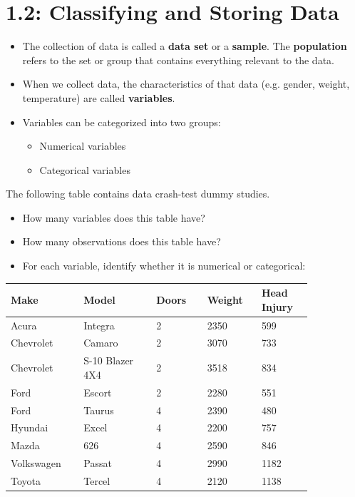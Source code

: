 \documentclass[../mathNotesPreamble]{subfiles}
\providecommand{\relscalefact}{1.4}
\begin{document}
\relscale{\relscalefact}
  \section{1.2: Classifying and Storing Data}
  \begin{itemize}
    \item The collection of data is called a \textbf{data set} or a \textbf{sample}. The \textbf{population} refers to the set or group that contains everything relevant to the data.
    \item When we collect data, the characteristics of that data (e.g. gender, weight, temperature) are called \textbf{variables}.
    \item Variables can be categorized into two groups:
      \begin{itemize}
        \item Numerical variables
        \item Categorical variables
      \end{itemize}
  \end{itemize}

  \begin{ex*}
    The following table contains data crash-test dummy studies.
    \begin{itemize}
      \item How many variables does this table have?
      \item How many observations does this table have?
      \item For each variable, identify whether it is numerical or categorical:
    \end{itemize}
    \begin{center}
      \begin{tabular}{@{}*{2}{p{0.2\linewidth}}*{3}{M{0.145\linewidth}}@{}}\toprule
        Make  &  Model  &  Doors  &  Weight  &  Head Injury  \\\midrule
        Acura  &  Integra  &  2  &  2350  &  599  \\
        Chevrolet  &  Camaro  &  2  &  3070  &  733  \\
        Chevrolet  &  S-10 Blazer 4X4  &  2  &  3518  &  834  \\
        Ford  &  Escort  &  2  &  2280  &  551  \\
        Ford  &  Taurus  &  4  &  2390  &  480  \\
        Hyundai  &  Excel  &  4  &  2200  &  757  \\
        Mazda  &  626  &  4  &  2590  &  846  \\
        Volkswagen  &  Passat  &  4  &  2990  &  1182  \\
        Toyota  &  Tercel  &  4  &  2120  &  1138  \\\bottomrule
      \end{tabular}
    \end{center}
  \end{ex*}
  \pagebreak
\end{document}
